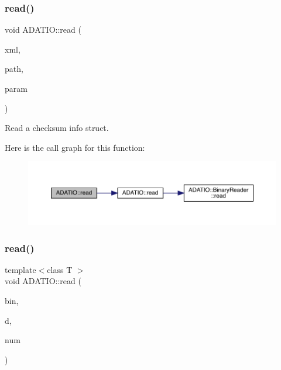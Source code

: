 \subsubsection{\texorpdfstring{read()}{read()}\hspace{0.1cm}{\footnotesize\ttfamily [17/28]}}
{\footnotesize\ttfamily void A\+D\+A\+T\+I\+O\+::read (\begin{DoxyParamCaption}\item[{\mbox{\hyperlink{classADATXML_1_1XMLReader}{X\+M\+L\+Reader}} \&}]{xml,  }\item[{const std\+::string \&}]{path,  }\item[{\mbox{\hyperlink{structADATIO_1_1QIOChecksumInfo__t}{Q\+I\+O\+Checksum\+Info\+\_\+t}} \&}]{param }\end{DoxyParamCaption})}



Read a checksum info struct. 

Here is the call graph for this function\+:
\nopagebreak
\begin{figure}[H]
\begin{center}
\leavevmode
\includegraphics[width=350pt]{d0/dba/namespaceADATIO_ab39e59b5ba8a584a1c5afd164173b9e7_cgraph}
\end{center}
\end{figure}
\mbox{\label{namespaceADATIO_a2a2a1e3d909d72f5e64dcded1bdb8012}} 
\subsubsection{\texorpdfstring{read()}{read()}\hspace{0.1cm}{\footnotesize\ttfamily [18/28]}}
{\footnotesize\ttfamily template$<$class T $>$ \\
void A\+D\+A\+T\+I\+O\+::read (\begin{DoxyParamCaption}\item[{\mbox{\hyperlink{classADATIO_1_1BinaryReader}{Binary\+Reader}} \&}]{bin,  }\item[{\mbox{\hyperlink{classXMLArray_1_1Array}{X\+M\+L\+Array\+::\+Array}}$<$ T $>$ \&}]{d,  }\item[{int}]{num }\end{DoxyParamCaption})\hspace{0.3cm}{\ttfamily [inline]}}



